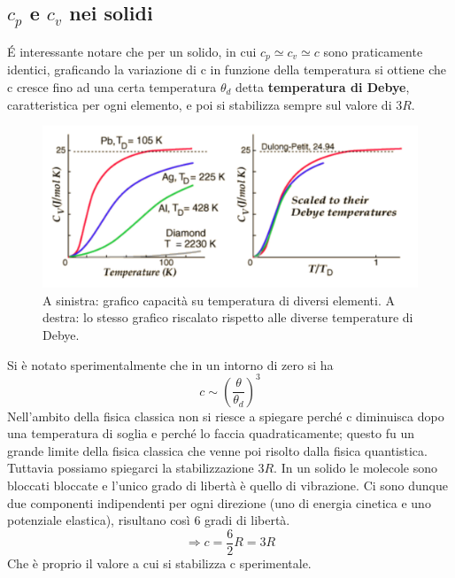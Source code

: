 \documentclass[10pt,a4paper]{article}
\begin{document}
\subsection{\(c_p\) e \(c_v\) nei solidi}
\'{E} interessante notare che per un solido, in cui \(c_p\simeq c_v\simeq c\) sono praticamente identici, graficando la variazione di c in funzione della temperatura si ottiene che c cresce fino ad una certa temperatura \(\theta_d\) detta \textbf{temperatura di Debye}, caratteristica per ogni elemento, e poi si stabilizza sempre sul valore di \(3R\). 
\begin{figure}[h!]
	\centering
	\includegraphics[width=0.7\linewidth]{../images/debye_temperature}
	\caption{A sinistra: grafico capacità su temperatura di diversi elementi. A destra: lo stesso grafico riscalato rispetto alle diverse temperature di Debye.}
	\label{fig:debyetemperature}
\end{figure}
\FloatBarrier
Si è notato sperimentalmente che in un intorno di zero si ha \[c \sim \left(\frac{\theta}{\theta_d}\right)^3\]
Nell'ambito della fisica classica non si riesce a spiegare perché c diminuisca dopo una temperatura di soglia e perché lo faccia quadraticamente; questo fu un grande limite della fisica classica che venne poi risolto dalla fisica quantistica. Tuttavia possiamo spiegarci la stabilizzazione $3R$. In un solido le molecole sono bloccati bloccate e l'unico grado di libertà è quello di vibrazione. Ci sono dunque due componenti indipendenti per ogni direzione (uno di energia cinetica e uno potenziale elastica), risultano così 6 gradi di libertà.
 \[\Rightarrow c = \frac{6}{2}R = 3R\] 
Che è proprio il valore a cui si stabilizza c sperimentale. 
\end{document}
